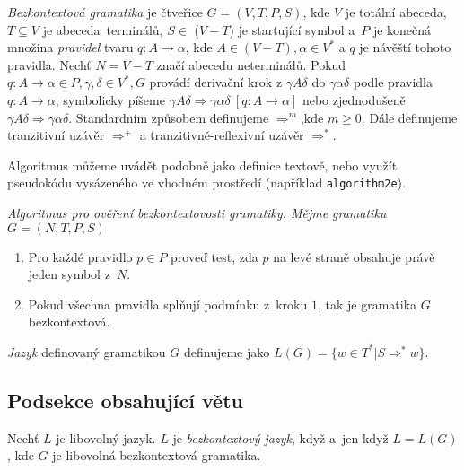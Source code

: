 \documentclass[11pt,a4paper,twocolumn,titlepage]{article}
\begin{document}
\begin{definition} \label{d:bezkon}
\emph{Bezkontextová gramatika} je čtveřice $G = (V,T,P,S)$, kde $V$ je totální abeceda, $T \subseteq V$ je abe\-ceda~terminálů, $S \in$ ($V - T$) je startující symbol a~$P$ je konečná množina \emph{pravidel} tvaru $q: A \rightarrow \alpha$, kde $A \in (V - T), \alpha \in V^*$ a $q$ je návěští tohoto pra\-vi\-dla. Nechť $N = V - T$ značí abecedu neterminálů. Po\-kud $q: A \rightarrow \alpha \in P, \gamma, \delta \in V^*, G$ provádí derivační krok z ${\gamma}A{\delta}$ do $\gamma\alpha\delta$ podle pravidla $q: A \rightarrow \alpha$, sym\-bolicky píšeme ${\gamma}A{\delta} \Rightarrow \gamma\alpha\delta\ [q: A \rightarrow \alpha]$ nebo zjed\-nodušeně ${\gamma}A{\delta} \Rightarrow \gamma\alpha\delta$. Standardním způsobem definu\-jeme $\Rightarrow^m \mbox{,kde } m \geq 0$. Dále definujeme tranzitivní uzávěr $\Rightarrow^+$ a tranzitivně-reflexivní uzávěr $\Rightarrow^*$. 
\medskip

Algoritmus můžeme uvádět podobně jako definice textově, nebo využít pseudokódu vysázeného ve vhodném prostředí (například \texttt{algorithm2e}).
\end{definition}

\begin{algorithm}
\emph{Algoritmus pro ověření bezkontextovosti gramatiky. Mějme gramatiku} $G = (N,T,P,S)$
\begin{enumerate}
\itshape \item {Pro každé pravidlo $p \in P$ proveď test, zda $p$ na levé straně obsahuje právě jeden symbol z~$N$.}
\itshape \item{Pokud všechna pravidla splňují podmínku z~kroku $1$, tak je gramatika $G$ bezkontextová.}
\end{enumerate}
\end{algorithm}
\begin{definition}
\emph{Jazyk} definovaný gramatikou $G$ definujeme jako $L(G) = \{w \in T^* | S \Rightarrow^* w\}$.
\end{definition}

\subsection{Podsekce obsahující větu}
\begin{definition}
Nechť $L$ je libovolný jazyk. $L$ je \emph{bezkontex\-tový jazyk}, když a~jen když $L = L(G)$, kde $G$ je libovolná bezkontextová gramatika.
\end{definition}
\end{document}
